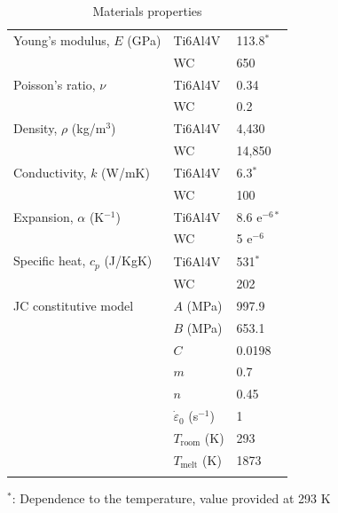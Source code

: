 \documentclass[preprint,12pt,times]{elsarticle}
\begin{document}
%
\begin{table}[!h]
\begin{center}
\caption{\label{tab:prop} Materials properties \cite{seo_Constitutive_2005, _GRANTA_2020, milosevic_Thermophysical_2012}}
\begin{tabular}{lll}
\hline\noalign{\smallskip}
Young's modulus, $E$ (GPa) & Ti6Al4V & 113.8$^*$\\
 & WC & 650\\
Poisson's ratio, $\nu$ & Ti6Al4V & 0.34\\
 & WC & 0.2\\
Density, $\rho$ (kg/m$^3$) & Ti6Al4V & 4,430\\
 & WC & 14,850\\
Conductivity, $k$ (W/mK) & Ti6Al4V & 6.3$^*$\\
 & WC & 100\\
Expansion, $\alpha$ (K$^{-1}$) & Ti6Al4V & 8.6 e$^{-6*}$\\
 & WC & 5 e$^{-6}$\\
Specific heat, $c_{p}$ (J/KgK) & Ti6Al4V & 531$^*$\\
 & WC & 202\\
\noalign{\smallskip}\hline\noalign{\smallskip}
JC constitutive model & $A$ (MPa) & 997.9\\
 & $B$ (MPa) & 653.1\\
 & $C$ & 0.0198\\
 & $m$ & 0.7\\
 & $n$ & 0.45\\
 & $\dot{\varepsilon}_{0}$ (s$^{-1}$) & 1\\
 & $T_{\text{room}}$ (K) & 293\\
 & $T_{\text{melt}}$ (K) & 1873\\
\noalign{\smallskip}\hline\noalign{\smallskip}
\end{tabular}
\end{center}
\vspace{-0.4cm}$^*$: Dependence to the temperature, value provided at 293 K
\end{table}
%
\end{document}
